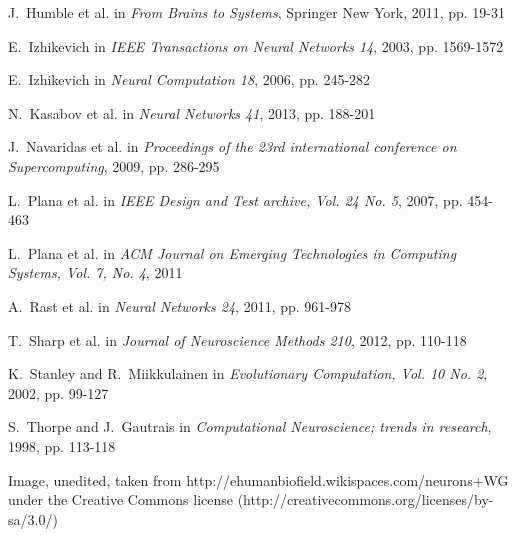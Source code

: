 \documentclass[journal]{./sty/IEEEtran}
\begin{document}
\begin{thebibliography}{23}
J.~Humble et al. in \emph{From Brains to Systems}, Springer New York, 2011, pp. 19-31

E.~Izhikevich in \emph{IEEE Transactions on Neural Networks 14}, 2003, pp. 1569-1572

E.~Izhikevich in \emph{Neural Computation 18}, 2006, pp. 245-282

N.~Kasabov et al. in \emph{Neural Networks 41}, 2013, pp. 188-201

J.~Navaridas et al. in \emph{Proceedings of the 23rd international conference on Supercomputing}, 2009, pp. 286-295 

L.~Plana et al. in \emph{IEEE Design and Test archive, Vol. 24 No. 5}, 2007, pp. 454-463

L.~Plana et al. in \emph{ACM Journal on Emerging Technologies in Computing Systems, Vol. 7, No. 4}, 2011

A.~Rast et al. in \emph{Neural Networks 24}, 2011, pp. 961-978

T.~Sharp et al. in \emph{Journal of Neuroscience Methods 210}, 2012, pp. 110-118

K.~Stanley and R.~Miikkulainen in \emph{Evolutionary Computation, Vol. 10 No. 2}, 2002, pp. 99-127

S.~Thorpe and J.~Gautrais in \emph{Computational Neuroscience; trends in research}, 1998, pp. 113-118

Image, unedited, taken from http://ehumanbiofield.wikispaces.com/neurons+WG under the Creative Commons license (http://creativecommons.org/licenses/by-sa/3.0/)

\end{thebibliography}
\end{document}
